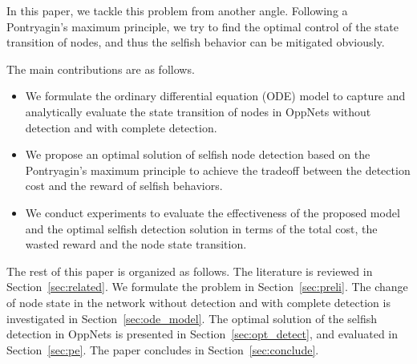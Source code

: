 In this paper,
we tackle this problem from another angle.
Following a Pontryagin's maximum principle,
we try to find the optimal control
of the state transition of nodes,
and thus the selfish behavior can be
mitigated obviously.

The main contributions are as follows.

\begin{itemize}
\item {We formulate the ordinary differential equation (ODE) model
to capture and analytically evaluate the state transition of nodes
in OppNets without detection and with complete detection.}
\item {We propose an optimal solution of selfish node detection
based on the Pontryagin's maximum principle
to achieve the tradeoff between the detection cost
and the reward of selfish behaviors.}
\item {We conduct experiments to evaluate
the effectiveness of the proposed model
and the optimal selfish detection solution
in terms of the total cost, the wasted reward and the node state transition.}
\end{itemize}

The rest of this paper is organized as follows.
The literature is reviewed in Section~\ref{sec:related}.
We formulate the problem in Section~\ref{sec:preli}.
The change of node state in the network without detection
and with complete detection
is investigated in Section~\ref{sec:ode_model}.
The optimal solution of the selfish detection in OppNets
is presented in Section~\ref{sec:opt_detect},
and evaluated in Section~\ref{sec:pe}.
The paper concludes in Section~\ref{sec:conclude}.
